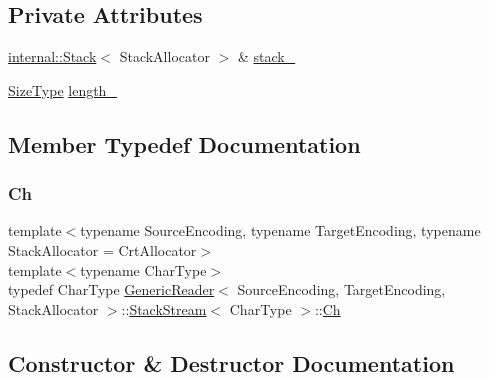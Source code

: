 \subsection*{Private Attributes}
\begin{DoxyCompactItemize}
\item 
\hyperlink{classinternal_1_1Stack}{internal\+::\+Stack}$<$ Stack\+Allocator $>$ \& \hyperlink{classGenericReader_1_1StackStream_a175494011b48c130d092129fae81bcc8}{stack\+\_\+}
\item 
\hyperlink{rapidjson_8h_a5ed6e6e67250fadbd041127e6386dcb5}{Size\+Type} \hyperlink{classGenericReader_1_1StackStream_a9a3711b7b92f4ff85e210c2d59163ff1}{length\+\_\+}
\end{DoxyCompactItemize}


\subsection{Member Typedef Documentation}
\mbox{\label{classGenericReader_1_1StackStream_a8b6ba64b97ed5f79f17d96428fd50ec0}} 
\subsubsection{\texorpdfstring{Ch}{Ch}}
{\footnotesize\ttfamily template$<$typename Source\+Encoding, typename Target\+Encoding, typename Stack\+Allocator = Crt\+Allocator$>$ \\
template$<$typename Char\+Type$>$ \\
typedef Char\+Type \hyperlink{classGenericReader}{Generic\+Reader}$<$ Source\+Encoding, Target\+Encoding, Stack\+Allocator $>$\+::\hyperlink{classGenericReader_1_1StackStream}{Stack\+Stream}$<$ Char\+Type $>$\+::\hyperlink{classGenericReader_1_1StackStream_a8b6ba64b97ed5f79f17d96428fd50ec0}{Ch}}



\subsection{Constructor \& Destructor Documentation}
\mbox{\label{classGenericReader_1_1StackStream_a288cf0f0385f706856b0e19c447e74ab}} 

